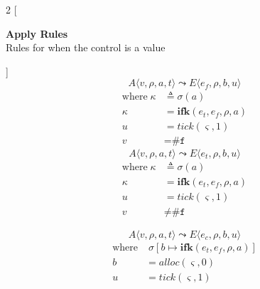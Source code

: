 \documentclass[12pt,draft]{article}
\newcommand{\falsesyn}{\texttt{\#f}}
\begin{document}
\newpage


\begin{multicols*}{2}
[
\begin{center}
\textbf{Apply Rules} \\
Rules for when the control is a value
\end{center}
]
\[
A\langle
v , \rho , a , t
\rangle
\leadsto
E\langle
e_f , \rho , b , u
\rangle
\]
\vspace{-12mm}
\begin{align*}
\text{where}\; \kappa &\triangleq \sigma(a) \\
\kappa &= \textbf{ifk}(e_t, e_f, \rho, a) \\
u &= tick(\varsigma, 1) \\
v &= \falsesyn
\end{align*}
\[
A\langle
v , \rho , a , t
\rangle
\leadsto
E\langle
e_t , \rho , b , u
\rangle
\]
\vspace{-10mm}
\begin{align*}
\text{where}\; \kappa &\triangleq \sigma(a) \\
\kappa &= \textbf{ifk}(e_t, e_f, \rho, a) \\
u &= tick(\varsigma, 1) \\
v &\not= \falsesyn
\end{align*}

\vfill\null
\columnbreak


\[
A\langle
v , \rho , a , t
\rangle
\leadsto
E\langle
e_c , \rho , b , u
\rangle
\]
\vspace{-13mm}
\begin{align*}
\text{where}&\; \sigma[b \mapsto \textbf{ifk}(e_t, e_f, \rho, a)] \\
b &= alloc(\varsigma, 0) \\
u &= tick(\varsigma, 1)
\end{align*}

\end{multicols*}
\end{document}

